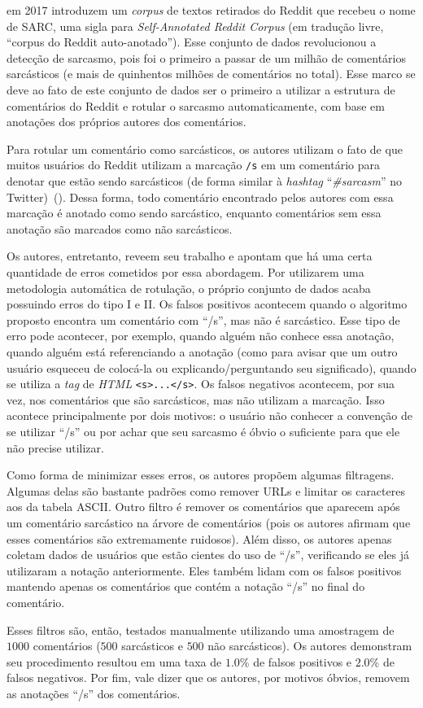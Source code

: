 \cite{khodak-etal:2017:sarc} em 2017 introduzem um \textit{corpus} de textos
retirados do Reddit que recebeu o nome de SARC, uma sigla para
\textit{Self-Annotated Reddit Corpus} (em tradução livre, ``corpus do Reddit
auto-anotado''). Esse conjunto de dados revolucionou a detecção de sarcasmo,
pois foi o primeiro a passar de um milhão de comentários sarcásticos (e mais de
quinhentos milhões de comentários no total). Esse marco se deve ao fato de este
conjunto de dados ser o primeiro a utilizar a estrutura de comentários do Reddit
e rotular o sarcasmo automaticamente, com base em anotações dos próprios autores
dos comentários.

Para rotular um comentário como sarcásticos, os autores utilizam o fato de que
muitos usuários do Reddit utilizam a marcação \texttt{/s} em um comentário para
denotar que estão sendo sarcásticos (de forma similar à \textit{hashtag}
``\textit{\#sarcasm}'' no Twitter)~(\cite{what-does-s-mean}). Dessa forma, todo
comentário encontrado pelos autores com essa marcação é anotado como sendo
sarcástico, enquanto comentários sem essa anotação são marcados como não
sarcásticos.

Os autores, entretanto, reveem seu trabalho e apontam que há uma certa
quantidade de erros cometidos por essa abordagem. Por utilizarem uma metodologia
automática de rotulação, o próprio conjunto de dados acaba possuindo erros do
tipo I e II. Os falsos positivos acontecem quando o algoritmo proposto encontra
um comentário com ``/s'', mas não é sarcástico. Esse tipo de erro pode
acontecer, por exemplo, quando alguém não conhece essa anotação, quando alguém
está referenciando a anotação (como para avisar que um outro usuário esqueceu de
colocá-la ou explicando/perguntando seu significado), quando se utiliza a
\textit{tag} de \textit{HTML} \texttt{<s>...</s>}. Os falsos negativos
acontecem, por sua vez, nos comentários que são sarcásticos, mas não utilizam a
marcação. Isso acontece principalmente por dois motivos: o usuário não conhecer
a convenção de se utilizar ``/s'' ou por achar que seu sarcasmo é óbvio o
suficiente para que ele não precise utilizar.

Como forma de minimizar esses erros, os autores propõem algumas filtragens.
Algumas delas são bastante padrões como remover URLs e limitar os caracteres aos
da tabela ASCII. Outro filtro é remover os comentários que aparecem após um
comentário sarcástico na árvore de comentários (pois os autores afirmam que
esses comentários são extremamente ruidosos). Além disso, os autores apenas
coletam dados de usuários que estão cientes do uso de ``/s'', verificando se
eles já utilizaram a notação anteriormente. Eles também lidam com os falsos
positivos mantendo apenas os comentários que contém a notação ``/s'' no final do
comentário.

Esses filtros são, então, testados manualmente utilizando uma amostragem de
$1000$ comentários ($500$ sarcásticos e $500$ não sarcásticos). Os autores
demonstram seu procedimento resultou em uma taxa de $1.0\%$ de falsos positivos
e $2.0\%$ de falsos negativos. Por fim, vale dizer que os autores, por motivos
óbvios, removem as anotações ``/s'' dos comentários.

